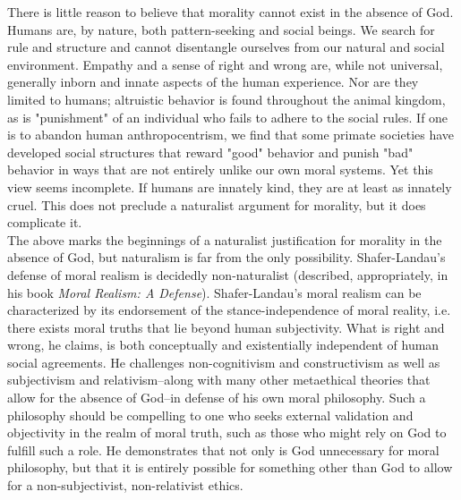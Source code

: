 \documentclass[a4paper, 11pt]{article}
\begin{document}
There is little reason to believe that morality cannot exist in the absence of God. Humans are, by nature, both pattern-seeking and social beings. We search for rule and structure and cannot disentangle ourselves from our natural and social environment. Empathy and a sense of right and wrong are, while not universal, generally inborn and innate aspects of the human experience. Nor are they limited to humans; altruistic behavior is found throughout the animal kingdom, as is "punishment" of an individual who fails to adhere to the social rules. If one is to abandon human anthropocentrism, we find that some primate societies have developed social structures that reward "good" behavior and punish "bad" behavior in ways that are not entirely unlike our own moral systems. Yet this view seems incomplete. If humans are innately kind, they are at least as innately cruel. This does not preclude a naturalist argument for morality, but it does complicate it. \\

The above marks the beginnings of a naturalist justification for morality in the absence of God, but naturalism is far from the only possibility. Shafer-Landau's defense of moral realism is decidedly non-naturalist (described, appropriately, in his book \textit{Moral Realism: A Defense}). Shafer-Landau's moral realism can be characterized by its endorsement of the stance-independence of moral reality, i.e. there exists moral truths that lie beyond human subjectivity. What is right and wrong, he claims, is both conceptually and existentially independent of human social agreements. He challenges non-cognitivism and constructivism as well as subjectivism and relativism--along with many other metaethical theories that allow for the absence of God--in defense of his own moral philosophy. Such a philosophy should be compelling to one who seeks external validation and objectivity in the realm of moral truth, such as those who might rely on God to fulfill such a role. He demonstrates that not only is God unnecessary for moral philosophy, but that it is entirely possible for something other than God to allow for a non-subjectivist, non-relativist ethics. 
\end{document}
